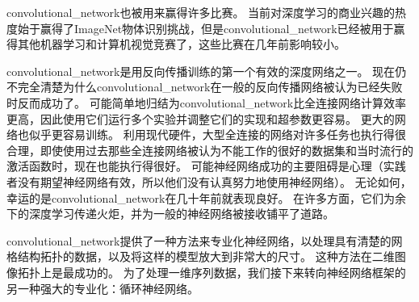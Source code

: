 \gls{convolutional_network}也被用来赢得许多比赛。
当前对深度学习的商业兴趣的热度始于\cite{Krizhevsky-2012-small}赢得了ImageNet物体识别挑战，但是\gls{convolutional_network}已经被用于赢得其他机器学习和计算机视觉竞赛了，这些比赛在几年前影响较小。
 
 
\gls{convolutional_network}是用反向传播训练的第一个有效的深度网络之一。
现在仍不完全清楚为什么\gls{convolutional_network}在一般的反向传播网络被认为已经失败时反而成功了。
可能简单地归结为\gls{convolutional_network}比全连接网络计算效率更高，因此使用它们运行多个实验并调整它们的实现和超参数更容易。
更大的网络也似乎更容易训练。
利用现代硬件，大型全连接的网络对许多任务也执行得很合理，即使使用过去那些全连接网络被认为不能工作的很好的数据集和当时流行的激活函数时，现在也能执行得很好。
可能神经网络成功的主要阻碍是心理（实践者没有期望神经网络有效，所以他们没有认真努力地使用神经网络）。
无论如何，幸运的是\gls{convolutional_network}在几十年前就表现良好。
在许多方面，它们为余下的深度学习传递火炬，并为一般的神经网络被接收铺平了道路。

\gls{convolutional_network}提供了一种方法来专业化神经网络，以处理具有清楚的网格结构拓扑的数据，以及将这样的模型放大到非常大的尺寸。 
这种方法在二维图像拓扑上是最成功的。
为了处理一维序列数据，我们接下来转向神经网络框架的另一种强大的专业化：循环神经网络。

 
 










